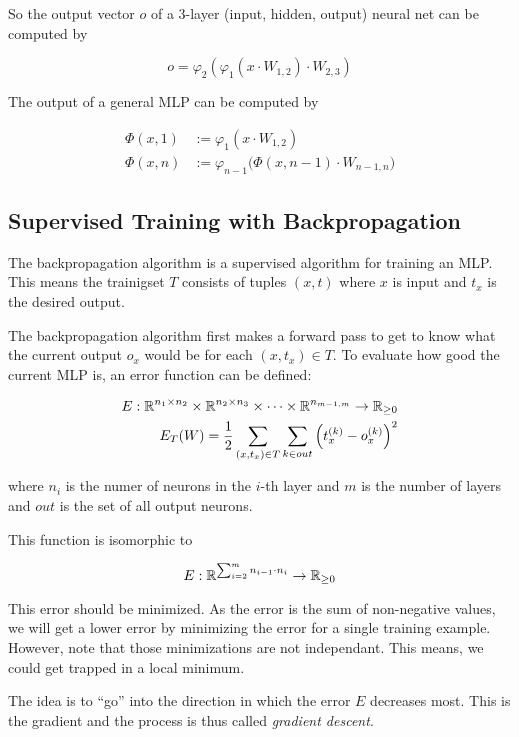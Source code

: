 So the output vector $o$ of a 3-layer (input, hidden, output) neural net can be
computed by

\[o = \varphi_2(\varphi_1(x \cdot W_{1,2}) \cdot W_{2,3})\]

The output of a general \gls{MLP} can be computed by

\begin{align*}
    \Phi(x, 1) &:= \varphi_{1}(x \cdot W_{1,2})\\
    \Phi(x, n) &:= \varphi_{n-1} \big (\Phi(x, n-1) \cdot W_{n-1, n} \big)
\end{align*}

\subsection{Supervised Training with Backpropagation}
The backpropagation algorithm is a supervised algorithm for training an
\gls{MLP}. This means the trainigset $T$ consists of tuples $(x, t)$
where $x$ is input and $t_x$ is the desired output.

The backpropagation algorithm first makes a forward pass to get to know what
the current output $o_x$ would be for each $(x, t_x) \in T$.
To evaluate how good the current \gls{MLP} is, an error function can be defined:

\begin{align*}
    E: \mathbb{R}^{n_1 \times n_2} \times \mathbb{R}^{n_2 \times n_3} \times \dots \times \mathbb{R}^{n_{m-1, m}} \rightarrow \mathbb{R}_{\geq 0}\\
    E_T(W) = \frac{1}{2} \sum_{(x, t_x) \in T} \sum_{k \in out} \left (t_{x}^{(k)} - o_{x}^{(k)} \right )^2
\end{align*}

where $n_i$ is the numer of neurons in the $i$-th layer and $m$ is the number
of layers and $out$ is the set of all output neurons.

This function is isomorphic to 

\[E: \mathbb{R}^{\sum_{i=2}^m n_{i-1} \cdot n_{i}} \rightarrow \mathbb{R}_{\geq 0}\]

This error should be minimized. As the error is the sum of non-negative values,
we will get a lower error by minimizing the error for a single training example.
However, note that those minimizations are not independant. This means, we could
get trapped in a local minimum.

The idea is to \enquote{go} into the direction in which the error $E$ decreases
most. This is the gradient and the process is thus called \textit{gradient descent}.

